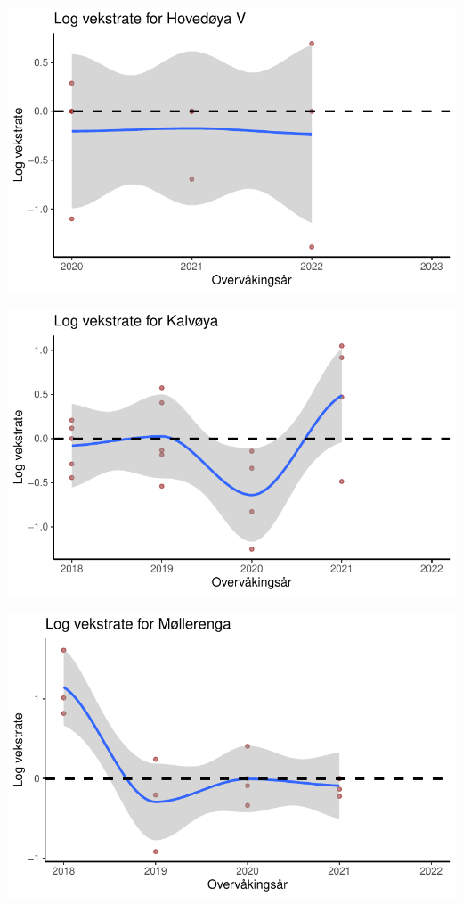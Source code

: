\documentclass[
  letterpaper,
  DIV=11,
  numbers=noendperiod]{scrreport}
\begin{document}
\includegraphics{growthRate_files/figure-pdf/unnamed-chunk-4-5.pdf}

\includegraphics{growthRate_files/figure-pdf/unnamed-chunk-4-6.pdf}

\includegraphics{growthRate_files/figure-pdf/unnamed-chunk-4-7.pdf}
\end{document}
